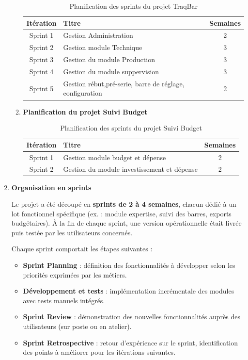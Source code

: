 \documentclass[11pt,a4paper]{article}
\begin{document}
\begin{enumerate}
\begin{enumerate}
\begin{table}[H]
\centering
\begin{tabular}{|c|p{8cm}|c|}
\hline
\textbf{Itération} & \textbf{Titre} & \textbf{Semaines} \\
\hline
Sprint 1 & Gestion Administration & 2 \\
\hline
Sprint 2 & Gestion module Technique & 3 \\
\hline
Sprint 3 & Gestion du module Production & 3 \\
\hline
Sprint 4 & Gestion du module suppervision & 3 \\
\hline
Sprint 5 & Gestion rébut,pré-serie, barre de réglage, configuration  & 2 \\
\hline
\end{tabular}
\caption{Planification des sprints du projet TraqBar}
\label{tab:planification_projet2}
\end{table}


	\item \textbf{Planification du projet Suivi Budget}
	
	
\begin{table}[H]
\centering
\begin{tabular}{|c|p{8cm}|c|}
\hline
\textbf{Itération} & \textbf{Titre} & \textbf{Semaines} \\
\hline
Sprint 1 & Gestion module budget et dépense & 2 \\
\hline
Sprint 2 & Gestion du module investissement et dépense  & 2 \\
\hline
\end{tabular}


\caption{Planification des sprints du projet Suivi Budget}
\label{tab:planification_projet1}
\end{table}

	\end{enumerate}
	
\item \textbf{Organisation en sprints}

Le projet a été découpé en \textbf{sprints de 2 à 4 semaines}, chacun dédié à un lot fonctionnel spécifique (ex. : module expertise, suivi des barres, exports budgétaires). À la fin de chaque sprint, une version opérationnelle était livrée puis testée par les utilisateurs concernés.

Chaque sprint comportait les étapes suivantes :
\begin{itemize}
    \item \textbf{Sprint Planning} : définition des fonctionnalités à développer selon les priorités exprimées par les métiers.
    \item \textbf{Développement et tests} : implémentation incrémentale des modules avec tests manuels intégrés.
    \item \textbf{Sprint Review} : démonstration des nouvelles fonctionnalités auprès des utilisateurs (sur poste ou en atelier).
    \item \textbf{Sprint Retrospective} : retour d’expérience sur le sprint, identification des points à améliorer pour les itérations suivantes.
\end{itemize}


\end{enumerate}
\end{document}
